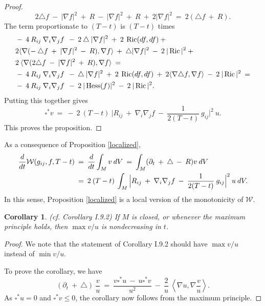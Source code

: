 \documentclass[12pt]{amsart}
\newcommand{\Hess}{\operatorname{Hess}}
\newcommand{\Ric}{\operatorname{Ric}}
\numberwithin{equation}{section}
\theoremstyle{plain}
\newtheorem{corollary}[equation]{Corollary}
\theoremstyle{definition}
\theoremstyle{remark}
\begin{document}
\begin{proof}
\begin{equation}
2 \triangle f \: - \: |\nabla f|^2 \: + \: R \: - \: |\nabla f|^2
\: + \: R \: + \: 2 |\nabla f|^2 \: = \: 2 (\triangle f \: + \: R).
\end{equation}
The term proportionate to $(T-t)$ is $(T-t)$ times
\begin{align}
& - \: 4 \: R_{ij} \: \nabla_i \nabla_j f \: \: - \:
2 \: \triangle \: |\nabla f|^2 \: + \: 2 \:
\Ric(df, df) \: + \\
&  2 \langle \nabla 
(- \: \triangle f \: + \: |\nabla f|^2 \: - \: R),
\nabla f \rangle \: + \:
\triangle |\nabla f|^2  \: - \: 2 \: |\Ric|^2 \: + \notag \\
& 2 \: \langle \nabla
(2 \triangle f \: - \: |\nabla f|^2 \: + \: R), 
\nabla f \rangle \: = \notag \\
&- \: 4 \: R_{ij} \: \nabla_i \nabla_j f \: \: - \:
\triangle \: |\nabla f|^2 \: + \: 2 \:
\Ric(df, df) \: + \:  2 \langle \nabla \triangle f,
\nabla f \rangle \: - \: 2 \: |\Ric|^2 \: = \notag \\
&- \: 4 \: R_{ij} \: \nabla_i \nabla_j f \: \: - \:
2 \: |\Hess(f)|^2 \: - \: 2 \: |\Ric|^2. \notag
\end{align}
Putting this together gives
\begin{equation}
\square^* v \: = \: - \: 2 \: (T-t) \:
\Big|R_{ij} \: + \: \nabla_i \nabla_j f \: - \: \frac{1}{2(T-t)} \: g_{ij}
\Big|^2 \: u.
\end{equation}
This proves the proposition.
\end{proof}

As a consequence of Proposition \ref{localized},
\begin{align}
\frac{d}{dt} {\mathcal W}(g_{ij}, f, T-t) \: & = \:
\frac{d}{dt} \int_M v \: dV \: = \:
\int_M (\partial_t \: + \: \triangle \: - \: R)v \: dV \\ 
& = \: 2 \: (T-t) \: \int_M
\Big|R_{ij} \: + \: \nabla_i \nabla_j f \: - \: \frac{1}{2(T-t)} \: g_{ij}
\Big|^2 \: u \: dV. \notag
\end{align}
In this sense, Proposition \ref{localized} is a local version of
the monotonicity of ${\mathcal W}$.

\begin{corollary} (cf. Corollary I.9.2) \label{whenever}
If $M$ is closed, or whenever the maximum principle holds, then
$\max v/u$ is nondecreasing in $t$.
\end{corollary}
\begin{proof}
We note that the statement of Corollary I.9.2
should have $\max v/u$ instead of
$\min v/u$.

To prove the corollary, we have
\begin{equation}
(\partial_t \: + \: \triangle) \: \frac{v}{u} \: = \:
\frac{v \square^* u \: - \: u \square^* v}{u^2} \: - \:
\frac{2}{u} \: \left\langle \nabla u, \nabla \frac{v}{u} 
\right\rangle.
\end{equation}
As $\square^* u = 0$ and $\square^* v \le 0$,
the corollary now follows from the maximum principle.
\end{proof}
\end{document}
